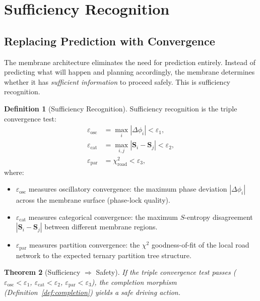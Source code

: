 \documentclass[12pt]{article}
\newtheorem{theorem}{Theorem}[section]
\theoremstyle{definition}
\newtheorem{definition}[theorem]{Definition}
\theoremstyle{remark}
\begin{document}
\section{Sufficiency Recognition}
\label{sec:sufficiency}

\subsection{Replacing Prediction with Convergence}

The membrane architecture eliminates the need for prediction entirely. Instead of predicting what will happen and planning accordingly, the membrane determines whether it has \emph{sufficient information} to proceed safely. This is sufficiency recognition.

\begin{definition}[Sufficiency Recognition]
\label{def:sufficiency}
Sufficiency recognition is the triple convergence test:
\begin{align}
  \varepsilon_{\mathrm{osc}} &= \max_i |\Delta\phi_i| < \varepsilon_1, \label{eq:eps_osc} \\
  \varepsilon_{\mathrm{cat}} &= \max_{i,j} |\mathbf{S}_i - \mathbf{S}_j| < \varepsilon_2, \label{eq:eps_cat} \\
  \varepsilon_{\mathrm{par}} &= \chi^2_{\mathrm{road}} < \varepsilon_3, \label{eq:eps_par}
\end{align}
where:
\begin{itemize}
  \item $\varepsilon_{\mathrm{osc}}$ measures oscillatory convergence: the maximum phase deviation $|\Delta\phi_i|$ across the membrane surface (phase-lock quality).
  \item $\varepsilon_{\mathrm{cat}}$ measures categorical convergence: the maximum $S$-entropy disagreement $|\mathbf{S}_i - \mathbf{S}_j|$ between different membrane regions.
  \item $\varepsilon_{\mathrm{par}}$ measures partition convergence: the $\chi^2$ goodness-of-fit of the local road network to the expected ternary partition tree structure.
\end{itemize}
\end{definition}

\begin{theorem}[Sufficiency $\Rightarrow$ Safety]
\label{thm:sufficiency_safety}
If the triple convergence test passes ($\varepsilon_{\mathrm{osc}} < \varepsilon_1$, $\varepsilon_{\mathrm{cat}} < \varepsilon_2$, $\varepsilon_{\mathrm{par}} < \varepsilon_3$), the completion morphism (Definition~\ref{def:completion}) yields a safe driving action.
\end{theorem}
\end{document}
